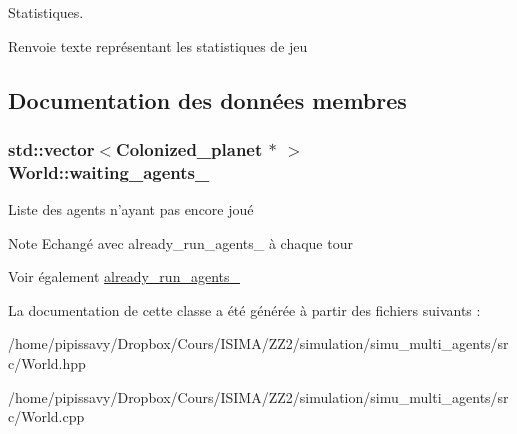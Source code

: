 Statistiques. 

\begin{DoxyReturn}{Renvoie}
texte représentant les statistiques de jeu 
\end{DoxyReturn}


\subsection{Documentation des données membres}
\hypertarget{classWorld_a732ce05c7e0012b98e2a8715b41d89fd}{
\subsubsection[{waiting\-\_\-agents\-\_\-}]{\setlength{\rightskip}{0pt plus 5cm}std\-::vector$<${\bf Colonized\-\_\-planet} $\ast$ $>$ World\-::waiting\-\_\-agents\-\_\-\hspace{0.3cm}{\ttfamily [private]}}}\label{classWorld_a732ce05c7e0012b98e2a8715b41d89fd}


Liste des agents n'ayant pas encore joué 

\begin{DoxyNote}{Note}
Echangé avec already\-\_\-run\-\_\-agents\-\_\- à chaque tour 
\end{DoxyNote}
\begin{DoxySeeAlso}{Voir également}
\hyperlink{classWorld_aafbe82365fac0f0d0e98c95d33a258f9}{already\-\_\-run\-\_\-agents\-\_\-} 
\end{DoxySeeAlso}


La documentation de cette classe a été générée à partir des fichiers suivants \-:\begin{DoxyCompactItemize}
\item 
/home/pipissavy/\-Dropbox/\-Cours/\-I\-S\-I\-M\-A/\-Z\-Z2/simulation/simu\-\_\-multi\-\_\-agents/src/World.\-hpp\item 
/home/pipissavy/\-Dropbox/\-Cours/\-I\-S\-I\-M\-A/\-Z\-Z2/simulation/simu\-\_\-multi\-\_\-agents/src/World.\-cpp\end{DoxyCompactItemize}

